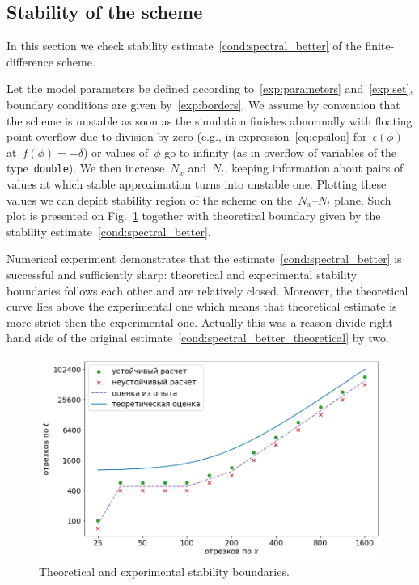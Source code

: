 \subsection{Stability of the scheme}

In this section we check stability
estimate~\eqref{cond:spectral_better} of the
finite-difference scheme.

Let the model parameters be defined according
to~\eqref{exp:parameters} and~\eqref{exp:set}, boundary conditions are given by~\eqref{exp:borders}.
We assume by convention that the scheme is unstable as soon as
the simulation finishes abnormally with floating point overflow
due to division by zero (e.g., in expression~\eqref{eq:epsilon}
for~$\epsilon(\phi)$
at~$f(\phi) = -\delta$)
or values of~$\phi$ go to infinity
(as in overflow of  variables of the type~\texttt{double}).
We then increase~$N_x$ and~$N_t$, keeping information about
pairs of values at which stable approximation turns into unstable one.
Plotting these values we can depict stability region of the scheme
on the~$N_x$--$N_t$ plane.
Such plot is presented on Fig.~\ref{fig:stability_bounds}
together with theoretical boundary given by the stability
estimate~\eqref{cond:spectral_better}.

Numerical experiment demonstrates that the
estimate~\eqref{cond:spectral_better} is successful and sufficiently
sharp: theoretical and experimental stability boundaries follows each other and
are relatively closed. Moreover, the theoretical curve lies above
the experimental one which means that theoretical estimate is more
strict then the experimental one. Actually this was a reason divide
right hand side of the original estimate~\eqref{cond:spectral_better_theoretical} by two.
\begin{figure}[!t]
	\centering
	\includegraphics[width=\textwidth]{figures/stability_bounds.png}
	\vspace{-0.7cm}
	\caption{Theoretical and experimental stability boundaries.}
	\label{fig:stability_bounds}
\end{figure}


